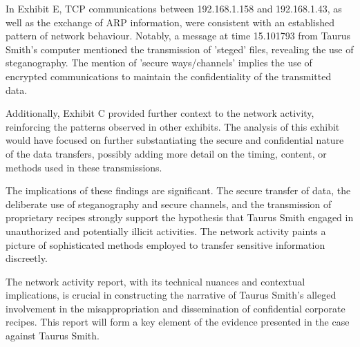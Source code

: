 In Exhibit E, TCP communications between 192.168.1.158 and 192.168.1.43, as well as the exchange of ARP information, were consistent with an established pattern of network behaviour. Notably, a message at time 15.101793 from Taurus Smith's computer mentioned the transmission of 'steged' files, revealing the use of steganography. The mention of 'secure ways/channels' implies the use of encrypted communications to maintain the confidentiality of the transmitted data.

Additionally, Exhibit C provided further context to the network activity, reinforcing the patterns observed in other exhibits. The analysis of this exhibit would have focused on further substantiating the secure and confidential nature of the data transfers, possibly adding more detail on the timing, content, or methods used in these transmissions.

The implications of these findings are significant. The secure transfer of data, the deliberate use of steganography and secure channels, and the transmission of proprietary recipes strongly support the hypothesis that Taurus Smith engaged in unauthorized and potentially illicit activities. The network activity paints a picture of sophisticated methods employed to transfer sensitive information discreetly.

The network activity report, with its technical nuances and contextual implications, is crucial in constructing the narrative of Taurus Smith's alleged involvement in the misappropriation and dissemination of confidential corporate recipes. This report will form a key element of the evidence presented in the case against Taurus Smith.
